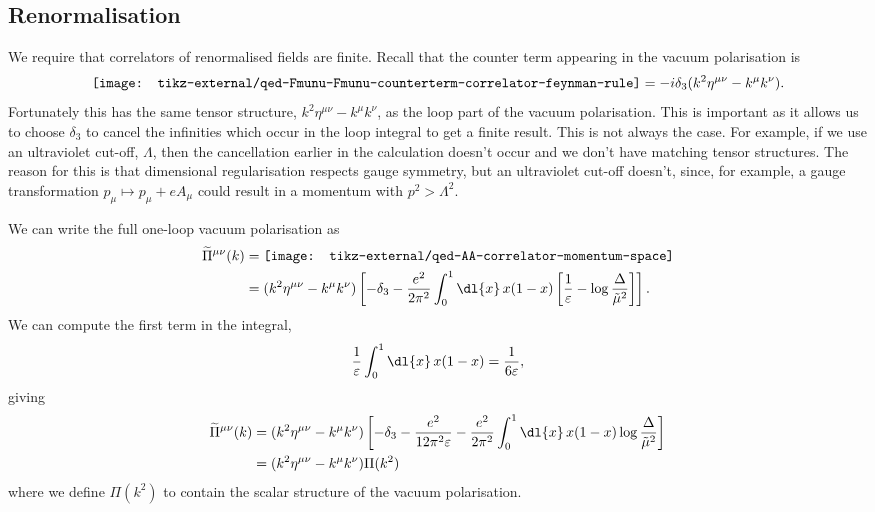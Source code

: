 \documentclass[fleqn]{NotesClass}
\newcommand{\minkowskiMetric}{\eta}
\begin{document}
    \subsection{Renormalisation}
    We require that correlators of renormalised fields are finite.
    Recall that the counter term appearing in the vacuum polarisation is
    \begin{equation}
        \vcenter{\hbox{\texttt{[image: tikz-external/qed-Fmunu-Fmunu-counterterm-correlator-feynman-rule]}}} = -i\delta_3(k^2\minkowskiMetric^{\mu\nu} - k^\mu k^\nu).
    \end{equation}
    Fortunately this has the same tensor structure, \(k^2 \minkowskiMetric^{\mu\nu} - k^\mu k^\nu\), as the loop part of the vacuum polarisation.
    This is important as it allows us to choose \(\delta_3\) to cancel the infinities which occur in the loop integral to get a finite result.
    This is not always the case.
    For example, if we use an ultraviolet cut-off, \(\Lambda\), then the cancellation earlier in the calculation doesn't occur and we don't have matching tensor structures.
    The reason for this is that dimensional regularisation respects gauge symmetry, but an ultraviolet cut-off doesn't, since, for example, a gauge transformation \(p_\mu \mapsto p_\mu + eA_\mu\) could result in a momentum with \(p^2 > \Lambda^2\).
    
    We can write the full one-loop vacuum polarisation as
    \begin{align}
        \widetilde{\Pi}^{\mu\nu}(k) &= 
        \vcenter{\hbox{\texttt{[image: tikz-external/qed-AA-correlator-momentum-space]}}}\\
        &= (k^2 \minkowskiMetric^{\mu\nu} - k^\mu k^\nu) \left[ -\delta_3 - \frac{e^2}{2\pi^2} \int_0^1 \dl{x} \, x(1 - x)\left[ \frac{1}{\varepsilon} - \log \frac{\Delta}{\tilde{\mu}^2} \right] \right].
    \end{align}
    We can compute the first term in the integral,
    \begin{equation}
        \frac{1}{\varepsilon} \int_0^1 \dl{x} \, x(1 - x) = \frac{1}{6\varepsilon},
    \end{equation}
    giving
    \begin{align}
        \widetilde{\Pi}^{\mu\nu}(k) &= (k^2 \minkowskiMetric^{\mu\nu} - k^\mu k^\nu) \left[ -\delta_3 - \frac{e^2}{12\pi^2\varepsilon} - \frac{e^2}{2\pi^2} \int_0^1 \dl{x} \, x(1 - x) \log\frac{\Delta}{\tilde{\mu}^2} \right]\\
        &= (k^2 \minkowskiMetric^{\mu\nu} - k^\mu k^\nu) \Pi(k^2)
    \end{align}
    where we define \(\Pi(k^2)\) to contain the scalar structure of the vacuum polarisation.
    
\end{document}
